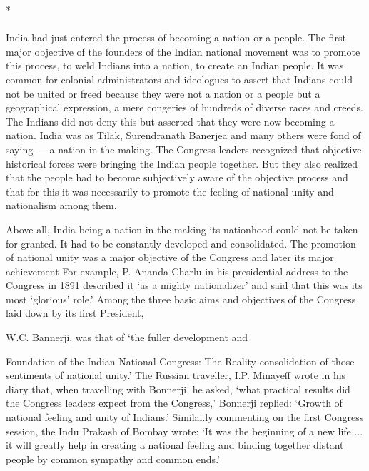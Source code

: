 \begin{center}*\end{center}

\paragraph*{}

India had just entered the process of becoming a nation or a people. The first major objective of the founders of the Indian national movement was to promote this process, to weld Indians into a nation, to create an Indian people. It was common for colonial administrators and ideologues to assert that Indians could not be united or freed because they were not a nation or a people but a geographical expression, a mere congeries of hundreds of diverse races and creeds. The Indians did not deny this but asserted that they were now becoming a nation. India was as Tilak, Surendranath Banerjea and many others were fond of saying --- a nation-in-the-making. The Congress leaders recognized that objective historical forces were bringing the Indian people together. But they also realized that the people had to become subjectively aware of the objective process and that for this it was necessarily to promote the feeling of national unity and nationalism among them.

Above all, India being a nation-in-the-making its nationhood could not be taken for granted. It had to be constantly developed and consolidated. The promotion of national unity was a major objective of the Congress and later its major achievement For example, P. Ananda Charlu in his presidential address to the Congress in 1891 described it `as a mighty nationalizer' and said that this was its most `glorious' role.' Among the three basic aims and objectives of the Congress laid down by its first President,

W.C. Bannerji, was that of `the fuller development and

Foundation of the Indian National Congress: The Reality consolidation of those sentiments of national unity.' The Russian traveller, I.P. Minayeff wrote in his diary that, when travelling with Bonnerji, he asked, `what practical results did the Congress leaders expect from the Congress,' Bonnerji replied: `Growth of national feeling and unity of Indians.' Similai.ly commenting on the first Congress session, the Indu Prakash of Bombay wrote: `It was the beginning of a new life ... it will greatly help in creating a national feeling and binding together distant people by common sympathy and common ends.'

